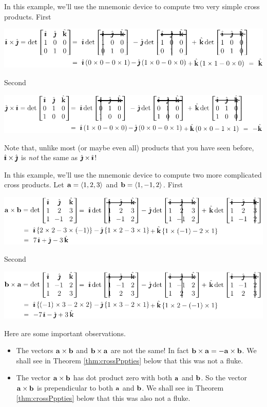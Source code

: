 \begin{eg}\label{eg:GEOcrossijji}
In this example, we'll use the mnemonic device to compute two very simple cross
products. First
      \begin{center}
      \includegraphics{detij.pdf}
      \end{center}
Second
      \begin{center}
      \includegraphics{detji.pdf}
      \end{center}
Note that, unlike most (or maybe even all) products that you have seen before, $\hat{\pmb{\imath}}\times\hat{\pmb{\jmath}}$ is \emph{not} the same as $\hat{\pmb{\jmath}}\times\hat{\pmb{\imath}}$!
\end{eg}

\begin{eg}\label{eg:GEOcrossEgA}
In this example, we'll use the mnemonic device to compute two more complicated cross products. Let $\mathbf{a}=\left< 1,2,3 \right>$ and $\mathbf{b}=\left< 1,-1,2 \right>$. First
      \begin{center}
      \includegraphics{detEgA1.pdf}
      \end{center}
Second
      \begin{center}
      \includegraphics{detEgA2.pdf}
      \end{center}
Here are some important observations.
\begin{itemize}
\item 
The vectors $\mathbf{a}\times\mathbf{b}$ and $\mathbf{b}\times\mathbf{a}$ are not the same! In fact
    $\mathbf{b}\times\mathbf{a}=-\mathbf{a}\times\mathbf{b}$. We shall see in Theorem \ref{thm:crossPppties}
    below that this was not a fluke.

\item
The vector $\mathbf{a}\times\mathbf{b}$ has dot product zero with both $\mathbf{a}$ and $\mathbf{b}$.
So the vector  $\mathbf{a}\times\mathbf{b}$ is prependicular to both $\mathbf{a}$ and $\mathbf{b}$. 
We shall see in Theorem \ref{thm:crossPppties} below that this was also not a fluke.
\end{itemize}
\end{eg}

